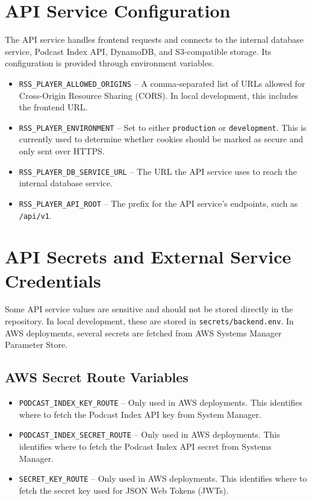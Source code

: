 \documentclass{article}
\begin{document}
\section{API Service Configuration}
The API service handles frontend requests and connects to the internal database service, Podcast Index API, DynamoDB, and S3-compatible storage. Its configuration is provided through environment variables.
\begin{itemize}
    \item \texttt{RSS\_PLAYER\_ALLOWED\_ORIGINS} -- A comma-separated list of URLs allowed for Cross-Origin Resource Sharing (CORS). In local development, this includes the frontend URL.
    \item \texttt{RSS\_PLAYER\_ENVIRONMENT} -- Set to either \texttt{production} or \texttt{development}. This is currently used to determine whether cookies should be marked as secure and only sent over HTTPS.
    \item \texttt{RSS\_PLAYER\_DB\_SERVICE\_URL} -- The URL the API service uses to reach the internal database service. 
    \item \texttt{RSS\_PLAYER\_API\_ROOT} -- The prefix for the API service's endpoints, such as \texttt{/api/v1}.
\end{itemize}
\section{API Secrets and External Service Credentials}
Some API service values are sensitive and should not be stored directly in the repository. In local development, these are stored in \texttt{secrets/backend.env}. In AWS deployments, several secrets are fetched from AWS Systems Manager Parameter Store.
\subsection{AWS Secret Route Variables}
\begin{itemize}
    \item \texttt{PODCAST\_INDEX\_KEY\_ROUTE} -- Only used in AWS deployments. This identifies where to fetch the Podcast Index API key from System Manager.
    \item \texttt{PODCAST\_INDEX\_SECRET\_ROUTE} -- Only used in AWS deployments. This identifies where to fetch the Podcast Index API secret from Systems Manager.
    \item \texttt{SECRET\_KEY\_ROUTE} -- Only used in AWS deployments. This identifies where to fetch the secret key used for JSON Web Tokens (JWTs).
\end{itemize}
\end{document}
